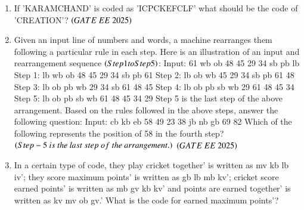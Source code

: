 \documentclass[journal,12pt,onecolumn]{IEEEtran}
\theoremstyle{remark}
\begin{document}
\begin{enumerate}
  \item If 'KARAMCHAND' is coded as 'ICPCKEFCLF' what should be the code of 'CREATION'?      
\hfill $\brak{GATE\ EE\ 2025}$
    \begin{enumerate}
    \end{enumerate}
   \item { Given an input line of numbers and words, a machine rearranges them following a particular rule in each step. Here is an illustration of an input and rearrangement sequence  $\left(Step 1 to Step 5\right)$: \newline
Input: 61 wb ob 48 45 29 34 sb pb lb \newline
Step 1: lb wb ob 48 45 29 34 sb pb 61 \newline
Step 2: lb ob wb 45 29 34 sb pb 61 48 \newline
Step 3: lb ob pb wb 29 34 sb 61 48 45 \newline
Step 4: lb ob pb sb wb 29 61 48 45 34 \newline
Step 5: lb ob pb sb wb 61 48 45 34 29 \newline
Step 5 is the last step of the above arrangement. \newline
Based on the rules followed in the above steps, answer the following question: \newline
Input: cb kb eb 58 49 23 38 jb nb gb 69 82 \newline
Which of the following represents the position of 58 in the fourth step?\\ $\brak{Step-5\ is\ the\ last\ step\ of\ the\ arrangement.}$ }     
\hfill $\brak{GATE\ EE\ 2025}$
    \begin{enumerate}
      \end{enumerate}

   \item In a certain type of code, they play cricket together' is written as mv kb lb iv'; they score maximum points' is written as gb lb mb kv'; cricket score earned points' is written as mb gv kb kv' and points are earned together' is written as kv mv ob gv.' 
What is the code for earned maximum points'?
    

\end{enumerate}
\end{document}
